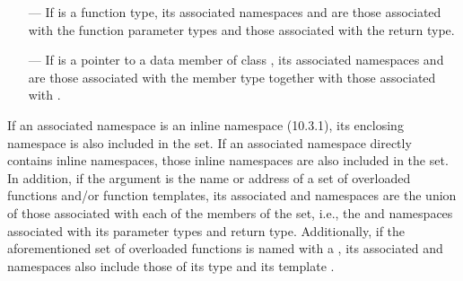 \begin{std.txt}
\begin{itemize}
  \item[---] If  is a function type, its associated
  namespaces and   are those
  associated with the function parameter types and those associated
  with the return type.

  \item[---] If  is a pointer to a data member of
  class , its associated namespaces
  and   are those associated with the
  member type together with those associated with .
  \end{itemize}

  If an associated namespace is an inline namespace (10.3.1), its
  enclosing namespace is also included in the set.  If an associated
  namespace directly contains inline namespaces, those inline
  namespaces are also included in the set.  In addition, if the
  argument is the name or address of a set of overloaded functions
  and/or function templates, its
  associated   and namespaces are the
  union of those associated with each of the members of the set, i.e.,
  the   and namespaces associated
  with its parameter types and return type.  Additionally, if the
  aforementioned set of overloaded functions is named with
  a , its
  associated   and namespaces also
  include those of its type  and its
  template .
\end{std.txt}

